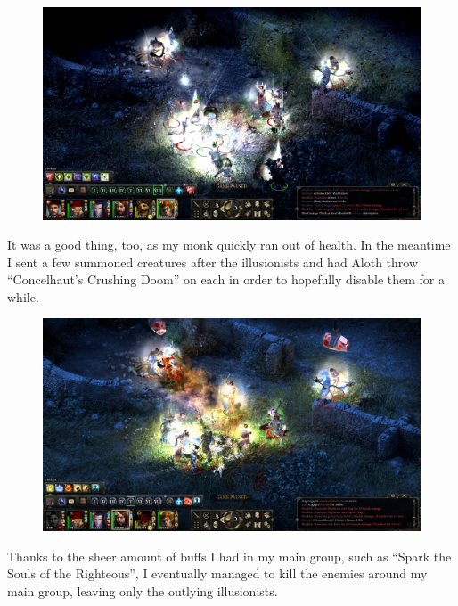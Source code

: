 \documentclass{article}
\begin{document}
\begin{figure}
\includegraphics[scale=0.33]{files/blog/2020_01_18_poe_potd_wmpt2/2020_01_18_bounty4_3.jpg}
\end{figure}

It was a good thing, too, as my monk quickly ran out of health.  In the meantime I sent a few summoned creatures after the illusionists and had Aloth throw ``Concelhaut's Crushing Doom'' on each in order to hopefully disable them for a while.

\begin{figure}
\includegraphics[scale=0.33]{files/blog/2020_01_18_poe_potd_wmpt2/2020_01_18_bounty4_4.jpg}
\end{figure}

Thanks to the sheer amount of buffs I had in my main group, such as ``Spark the Souls of the Righteous'', I eventually managed to kill the enemies around my main group, leaving only the outlying illusionists.
\end{document}
